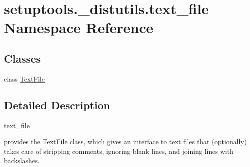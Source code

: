 \hypertarget{namespacesetuptools_1_1__distutils_1_1text__file}{}\section{setuptools.\+\_\+distutils.\+text\+\_\+file Namespace Reference}
\label{namespacesetuptools_1_1__distutils_1_1text__file}
\subsection*{Classes}
\begin{DoxyCompactItemize}
\item 
class \hyperlink{classsetuptools_1_1__distutils_1_1text__file_1_1TextFile}{Text\+File}
\end{DoxyCompactItemize}


\subsection{Detailed Description}
\begin{DoxyVerb}text_file

provides the TextFile class, which gives an interface to text files
that (optionally) takes care of stripping comments, ignoring blank
lines, and joining lines with backslashes.\end{DoxyVerb}
 